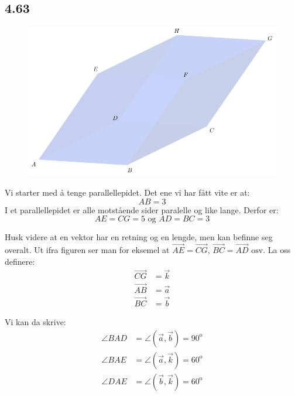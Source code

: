 \documentclass[english, 11 pt]{report}
\begin{document}
\subsection{4.63}
\begin{figure}[H]
	\centering
	\includegraphics[scale=0.5]{fig0}
\end{figure}

Vi starter med å tenge parallellepidet. Det ene vi har fått vite er at: \[ AB=3 \]
I et parallellepidet er alle motstående sider paralelle og like lange. Derfor er: \[ AE=CG=5 \text{ og } AD=BC=3 \] 

Husk videre at en vektor har en retning og en lengde, men kan befinne seg overalt. Ut ifra figuren ser man for eksemel at $ \overrightarrow{AE}=\overrightarrow{CG},\,\overrightarrow{BC}=\overrightarrow{AD}\text{ osv}  $. La oss definere:
\begin{align*}
\overrightarrow{CG} &= \vec{k} \\
\overrightarrow{AB} &= \vec{a} \\
\overrightarrow{BC} &= \vec{b}
\end{align*}

Vi kan da skrive: 
\begin{align*}
\angle BAD &= \angle(\vec a, \vec b) = 90^{\mathrm{o}} \\
\angle BAE &= \angle(\vec a, \vec k) = 60^{\mathrm{o}} \\
\angle DAE &= \angle(\vec b, \vec k) = 60^{\mathrm{o}} \\
\end{align*}
\end{document}
